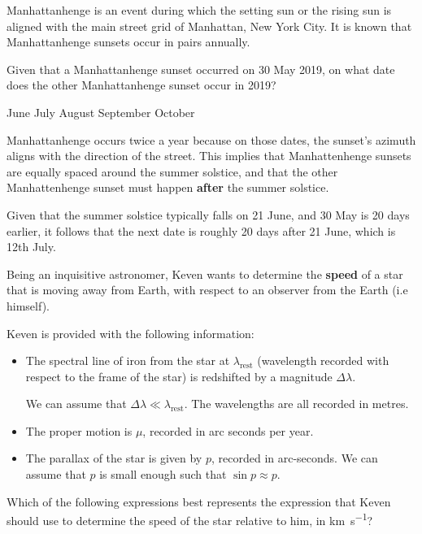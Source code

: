 \documentclass[a4paper,11pt]{exam}
\begin{document}
\begin{questions}
\filbreak
\question
	Manhattanhenge is an event during which the setting sun or the rising sun is aligned with the main street grid of Manhattan, New York City. It is known that Manhattanhenge sunsets occur in pairs annually.

	Given that a Manhattanhenge sunset occurred on 30 May 2019, on what date does the other Manhattanhenge sunset occur in 2019?

	\begin{oneparchoices}
		 June
		 July
		 August
		 September
		 October
	\end{oneparchoices}
	\begin{solution}
		Manhattanhenge occurs twice a year because on those dates, the sunset’s azimuth aligns with the direction of the street. This implies that Manhattenhenge sunsets are equally spaced around the summer solstice, and that the other Manhattenhenge sunset must happen \textbf{after} the summer solstice.

		Given that the summer solstice typically falls on 21 June, and 30 May is 20 days earlier, it follows that the next date is roughly 20 days after 21 June, which is 12th July.
	\end{solution}

\filbreak
\question
	Being an inquisitive astronomer, Keven wants to determine the \textbf{speed} of a star that is moving away from Earth, with respect to an observer from the Earth (i.e himself).

	Keven is provided with the following information:
	\begin{itemize}[leftmargin=10pt]
		\item The spectral line of iron from the star at $ \lambda_\text{rest} $ (wavelength recorded with respect to the frame of the star) is redshifted by a magnitude $ \Delta\lambda $.

		We can assume that $ \Delta\lambda \ll \lambda_\text{rest} $. The wavelengths are all recorded in metres.
		\item The proper motion is $ \mu $, recorded in arc seconds per year.
		\item The parallax of the star is given by $ p $, recorded in arc-seconds. We can assume that $ p $ is small enough such that $ \sin{p} \approx p $.
	\end{itemize}
	Which of the following expressions best represents the expression that Keven should use to determine the speed of the star relative to him, in \si{\km\per\s}?


\end{questions}
\end{document}
